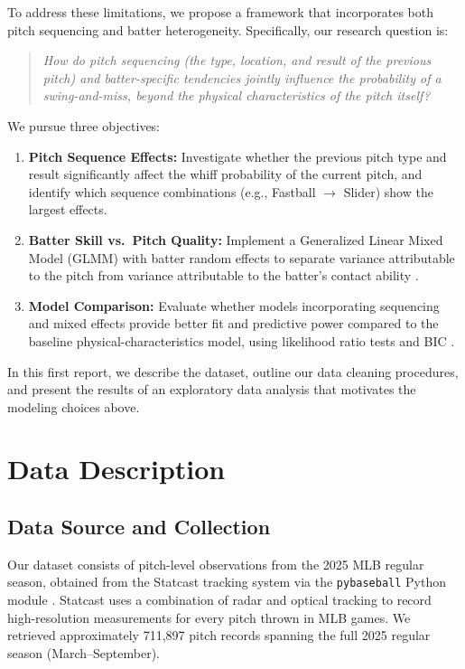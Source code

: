 \documentclass[11pt]{article}
\newcommand{\totalRaw}{711{,}897}        %
\begin{document}
To address these limitations, we propose a framework that incorporates both pitch sequencing and batter heterogeneity.
Specifically, our research question is:

\begin{quote}
\centering
\textit{How do pitch sequencing (the type, location, and result of the previous pitch) and batter-specific tendencies jointly influence the probability of a swing-and-miss, beyond the physical characteristics of the pitch itself?}
\end{quote}

\noindent
We pursue three objectives:
\begin{enumerate}[leftmargin=3em, label=\textbf{\arabic*.}]
    \item \textbf{Pitch Sequence Effects:} Investigate whether the previous pitch type and result significantly affect the whiff probability of the current pitch, and identify which sequence combinations (e.g., Fastball $\rightarrow$ Slider) show the largest effects.
    \item \textbf{Batter Skill vs.\ Pitch Quality:} Implement a Generalized Linear Mixed Model (GLMM) with batter random effects to separate variance attributable to the pitch from variance attributable to the batter's contact ability \citep{gelman2006data, bolker2009glmm}.
    \item \textbf{Model Comparison:} Evaluate whether models incorporating sequencing and mixed effects provide better fit and predictive power compared to the baseline physical-characteristics model, using likelihood ratio tests and BIC \citep{mccullagh2019generalized}.
\end{enumerate}

In this first report, we describe the dataset, outline our data cleaning procedures, and present the results of an exploratory data analysis that motivates the modeling choices above.

\section{Data Description}

\subsection{Data Source and Collection}

Our dataset consists of pitch-level observations from the 2025 MLB regular season, obtained from the Statcast tracking system via the \texttt{pybaseball} Python module \citep{pybaseball}.
Statcast uses a combination of radar and optical tracking to record high-resolution measurements for every pitch thrown in MLB games.
We retrieved approximately \totalRaw{} pitch records spanning the full 2025 regular season (March--September).
\end{document}
